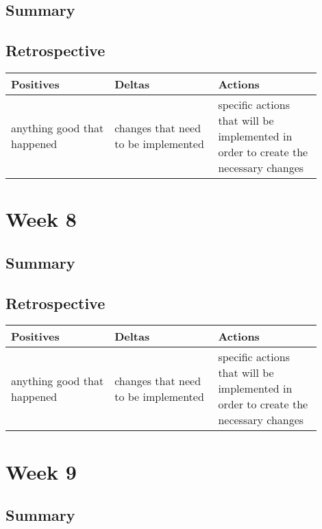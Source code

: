 \documentclass[letterpaper,10pt,serif,draftclsnofoot,onecolumn,compsoc,titlepage]{IEEEtran}
\begin{document}
\subsection{Summary}


\subsection{Retrospective}


\begin{tabular}{|p{0.3\linewidth}|p{0.3\linewidth}|p{0.3\linewidth}|}
   \hline
   \textbf{Positives} & \textbf{Deltas} & \textbf{Actions}\\ 
   \hline
   anything good that happened & changes that need to be implemented & specific actions that will be implemented in order to create the necessary changes \\
   \hline
\end{tabular}

\section{Week 8}

\subsection{Summary}


\subsection{Retrospective}


\begin{tabular}{|p{0.3\linewidth}|p{0.3\linewidth}|p{0.3\linewidth}|}
   \hline
   \textbf{Positives} & \textbf{Deltas} & \textbf{Actions}\\ 
   \hline
   anything good that happened & changes that need to be implemented & specific actions that will be implemented in order to create the necessary changes \\
   \hline
\end{tabular}

\section{Week 9}

\subsection{Summary}
\end{document}
